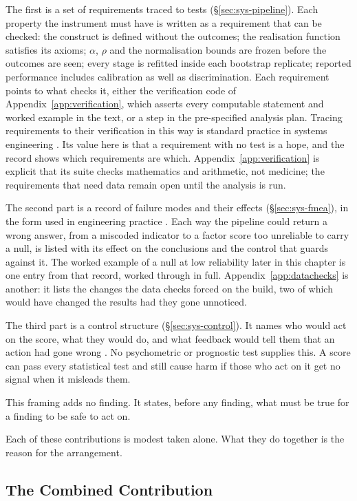 The first is a set of requirements traced to tests
(\S\ref{sec:sys-pipeline}). Each property the instrument must have is written as
a requirement that can be checked: the construct is defined without the
outcomes; the realisation function satisfies its axioms; $\alpha$, $\rho$ and
the normalisation bounds are frozen before the outcomes are seen; every stage is
refitted inside each bootstrap replicate; reported performance includes
calibration as well as discrimination. Each requirement points to what checks
it, either the verification code of Appendix~\ref{app:verification}, which
asserts every computable statement and worked example in the text, or a step in
the pre-specified analysis plan. Tracing requirements to their verification in
this way is standard practice in systems engineering \citep{incose_2015}. Its
value here is that a requirement with no test is a hope, and the record shows
which requirements are which. Appendix~\ref{app:verification} is explicit that
its suite checks mathematics and arithmetic, not medicine; the requirements that
need data remain open until the analysis is run.

The second part is a record of failure modes and their effects
(\S\ref{sec:sys-fmea}), in the form used in engineering practice
\citep{stamatis_2003}. Each way the pipeline could return a wrong answer, from a
miscoded indicator to a factor score too unreliable to carry a null, is listed
with its effect on the conclusions and the control that guards against it. The
worked example of a null at low reliability later in this chapter is one entry
from that record, worked through in full. Appendix~\ref{app:datachecks} is
another: it lists the changes the data checks forced on the build, two of which
would have changed the results had they gone unnoticed.

The third part is a control structure (\S\ref{sec:sys-control}). It names who
would act on the score, what they would do, and what feedback would tell them
that an action had gone wrong \citep{leveson_2011}. No psychometric or
prognostic test supplies this. A score can pass every statistical test and still
cause harm if those who act on it get no signal when it misleads them.

This framing adds no finding. It states, before any finding, what must be true
for a finding to be safe to act on.

Each of these contributions is modest taken alone. What they do together is
the reason for the arrangement.

\subsection{The Combined Contribution}

